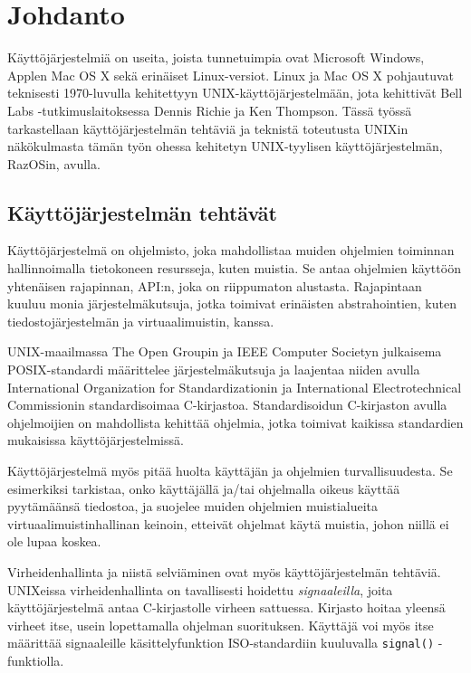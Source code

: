 \chapter{Johdanto}
\label{Johdanto}

Käyttöjärjestelmiä on useita, joista tunnetuimpia ovat Microsoft Windows, Applen Mac OS X sekä erinäiset Linux-versiot. Linux ja Mac OS X pohjautuvat teknisesti 1970-luvulla kehitettyyn UNIX-käyttöjärjestelmään, jota kehittivät Bell Labs -tutkimuslaitoksessa Dennis Richie ja Ken Thompson. Tässä työssä tarkastellaan käyttöjärjestelmän tehtäviä ja teknistä toteutusta UNIXin näkökulmasta tämän työn ohessa kehitetyn UNIX-tyylisen käyttöjärjestelmän, RazOSin, avulla.

\section{Käyttöjärjestelmän tehtävät}
Käyttöjärjestelmä on ohjelmisto, joka mahdollistaa muiden ohjelmien toiminnan hallinnoimalla tietokoneen resursseja, kuten muistia. Se antaa ohjelmien käyttöön yhtenäisen rajapinnan, API:n, joka on riippumaton alustasta. Rajapintaan kuuluu monia järjestelmäkutsuja, jotka toimivat erinäisten abstrahointien, kuten tiedostojärjestelmän ja virtuaalimuistin, kanssa.

\par

UNIX-maailmassa The Open Groupin ja IEEE Computer Societyn julkaisema POSIX-standardi määrittelee järjestelmäkutsuja ja laajentaa niiden avulla International Organization for Standardizationin ja International Electrotechnical Commissionin standardisoimaa C-kirjastoa. Standardisoidun C-kirjaston avulla ohjelmoijien on mahdollista kehittää ohjelmia, jotka toimivat kaikissa standardien mukaisissa käyttöjärjestelmissä.

\par

Käyttöjärjestelmä myös pitää huolta käyttäjän ja ohjelmien turvallisuudesta. Se esimerkiksi tarkistaa, onko käyttäjällä ja/tai ohjelmalla oikeus käyttää pyytämäänsä tiedostoa, ja suojelee muiden ohjelmien muistialueita virtuaalimuistinhallinan keinoin, etteivät ohjelmat käytä muistia, johon niillä ei ole lupaa koskea.

\par

Virheidenhallinta ja niistä selviäminen ovat myös käyttöjärjestelmän tehtäviä. UNIXeissa virheidenhallinta on tavallisesti hoidettu \textit{signaaleilla}, joita käyttöjärjestelmä antaa C-kirjastolle virheen sattuessa. Kirjasto hoitaa yleensä virheet itse, usein lopettamalla ohjelman suorituksen. Käyttäjä voi myös itse määrittää signaaleille käsittelyfunktion ISO-standardiin kuuluvalla \texttt{signal()} -funktiolla.